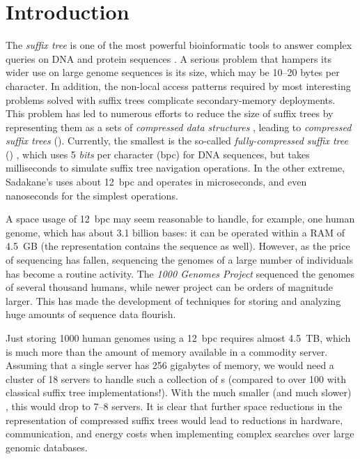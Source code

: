 
\section{Introduction}

The \emph{suffix tree} \cite{Weiner1973} is one of the most powerful bioinformatic tools to
answer complex queries on DNA and protein sequences \cite{Gus97,Ohl13,MBCT15}.
A serious problem that hampers its wider use on large genome sequences is its
size, which may be 10--20 bytes per character. In addition, the non-local
access patterns required by most interesting problems solved with suffix trees
complicate secondary-memory deployments. This problem has led to numerous
efforts to reduce the size of suffix trees by representing them as a sets of
\emph{compressed data structures} \cite{Sadakane2007,Fischer2009a,Ohlebusch2009,Ohlebusch2010,Russo2011,Gog2011a,Abeliuk2013,Navarro2014a}, leading to
\emph{compressed suffix trees} (\CST). Currently, the smallest
\CST{} is the so-called \emph{fully-compressed suffix tree} (\FCST)
\cite{Russo2011,Navarro2014a}, which uses 5 \emph{bits} per character (bpc)
for DNA sequences, but takes milliseconds to simulate suffix
tree navigation operations. In the other extreme, Sadakane's \CST{}
\cite{Sadakane2007} uses about 12~bpc and operates in
microseconds, and even nanoseconds for the simplest operations.

A space usage of 12~bpc may seem reasonable to handle, for example, one human
genome, which has about 3.1 billion bases: it can be operated within a
RAM of 4.5~GB (the representation contains the sequence as well). However,
as the price of sequencing has fallen, sequencing the genomes of a large
number of individuals has become a routine activity. The \emph{1000 Genomes
Project} \cite{1000GP} sequenced the genomes of several thousand humans,
while newer project can be orders of magnitude larger. This has made the
development of techniques for storing and analyzing huge amounts of sequence
data flourish.

Just storing 1000 human genomes using a 12~bpc \CST{} requires almost 4.5~TB, which
is much more than the amount of memory available in a commodity server. Assuming that
a single server has 256 gigabytes of memory, we would need a cluster of 18 servers to
handle such a collection of \CST{}s (compared to over 100 with classical suffix
tree implementations!). With the much smaller (and much slower) \FCST, this would
drop to 7--8 servers. It is clear that further space reductions in the
representation of compressed suffix trees would lead to reductions in hardware, communication,
and energy costs when implementing complex searches over large genomic
databases.

